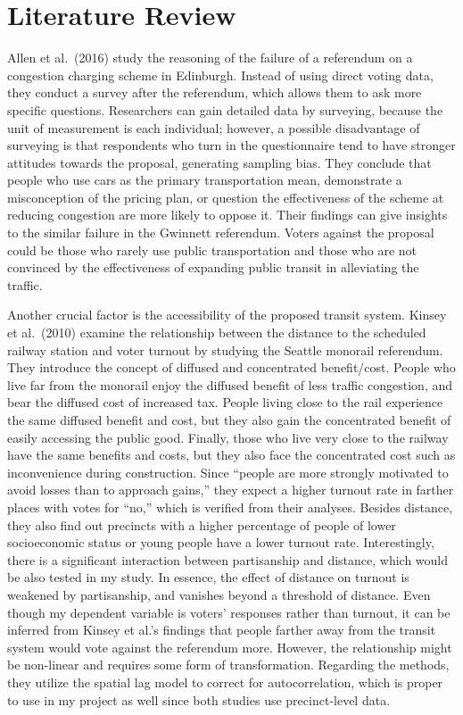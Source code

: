 \documentclass[
]{article}
\begin{document}
\hypertarget{literature-review}{%
\section{Literature Review}\label{literature-review}}

Allen et al.~(2016) study the reasoning of the failure of a referendum
on a congestion charging scheme in Edinburgh. Instead of using direct
voting data, they conduct a survey after the referendum, which allows
them to ask more specific questions. Researchers can gain detailed data
by surveying, because the unit of measurement is each individual;
however, a possible disadvantage of surveying is that respondents who
turn in the questionnaire tend to have stronger attitudes towards the
proposal, generating sampling bias. They conclude that people who use
cars as the primary transportation mean, demonstrate a misconception of
the pricing plan, or question the effectiveness of the scheme at
reducing congestion are more likely to oppose it. Their findings can
give insights to the similar failure in the Gwinnett referendum. Voters
against the proposal could be those who rarely use public transportation
and those who are not convinced by the effectiveness of expanding public
transit in alleviating the traffic.

Another crucial factor is the accessibility of the proposed transit
system. Kinsey et al.~(2010) examine the relationship between the
distance to the scheduled railway station and voter turnout by studying
the Seattle monorail referendum. They introduce the concept of diffused
and concentrated benefit/cost. People who live far from the monorail
enjoy the diffused benefit of less traffic congestion, and bear the
diffused cost of increased tax. People living close to the rail
experience the same diffused benefit and cost, but they also gain the
concentrated benefit of easily accessing the public good. Finally, those
who live very close to the railway have the same benefits and costs, but
they also face the concentrated cost such as inconvenience during
construction. Since ``people are more strongly motivated to avoid losses
than to approach gains,'' they expect a higher turnout rate in farther
places with votes for ``no,'' which is verified from their analyses.
Besides distance, they also find out precincts with a higher percentage
of people of lower socioeconomic status or young people have a lower
turnout rate. Interestingly, there is a significant interaction between
partisanship and distance, which would be also tested in my study. In
essence, the effect of distance on turnout is weakened by partisanship,
and vanishes beyond a threshold of distance. Even though my dependent
variable is voters' responses rather than turnout, it can be inferred
from Kinsey et al.'s findings that people farther away from the transit
system would vote against the referendum more. However, the relationship
might be non-linear and requires some form of transformation. Regarding
the methods, they utilize the spatial lag model to correct for
autocorrelation, which is proper to use in my project as well since both
studies use precinct-level data.
\end{document}
